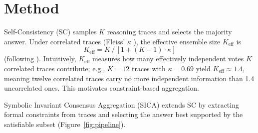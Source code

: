 \section{Method}
\label{sec:method}
\label{sec:pipeline}
\label{sec:condorcet}
\label{sec:effective-k}

Self-Consistency (SC) \citep{wang2023sc} samples $K$ reasoning traces and selects the majority answer. Under correlated traces (Fleiss' $\kappa$ \citep{fleiss1971kappa}), the effective ensemble size $K_\text{eff}$ is
\begin{equation}
\label{eq:effk}
K_{\text{eff}} = K \,/\, [1 + (K{-}1) \cdot \kappa]
\end{equation}
(following \citet{ladha1992correlated}). Intuitively, $K_\text{eff}$ measures how many effectively independent votes $K$ correlated traces contribute; e.g., $K{=}12$ traces with $\kappa{=}0.69$ yield $K_\text{eff} \approx 1.4$, meaning twelve correlated traces carry no more independent information than 1.4 uncorrelated ones. This motivates constraint-based aggregation.

Symbolic Invariant Consensus Aggregation (SICA) extends SC by extracting formal constraints from traces and selecting the answer best supported by the satisfiable subset (Figure~\ref{fig:pipeline}).

